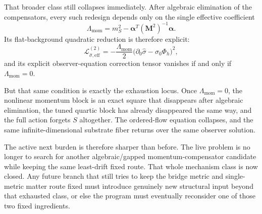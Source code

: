 \documentclass[11pt]{article}
\begin{document}
That broader class still collapses immediately. After algebraic elimination of the compensators, every such redesign depends only on the single effective coefficient
\[
\Lambda_{\mathrm{mom}}
=
m_S^2-\bm\alpha^T(\mathbf M^2)^{-1}\bm\alpha.
\]
Its flat-background quadratic reduction is therefore explicit:
\[
\mathcal L_{\hat\sigma,\mathrm{eff}}^{(2)}
=
-\frac{\Lambda_{\mathrm{mom}}}{2}
\bigl(\partial_0\hat\sigma-\sigma_0\Phi_h\bigr)^2,
\]
and its explicit observer-equation correction tensor vanishes if and only if \(\Lambda_{\mathrm{mom}}=0\).

But that same condition is exactly the exhaustion locus. Once \(\Lambda_{\mathrm{mom}}=0\), the nonlinear momentum block is an exact square that disappears after algebraic elimination, the tuned quartic block has already disappeared the same way, and the full action forgets \(S\) altogether. The ordered-flow equation collapses, and the same infinite-dimensional substrate fiber returns over the same observer solution.

The active next burden is therefore sharper than before. The live problem is no longer to search for another algebraic/gapped momentum-compensator candidate while keeping the same least-drift fixed route. That whole mechanism class is now closed. Any future branch that still tries to keep the bridge metric and single-metric matter route fixed must introduce genuinely new structural input beyond that exhausted class, or else the program must eventually reconsider one of those two fixed ingredients.
\end{document}
